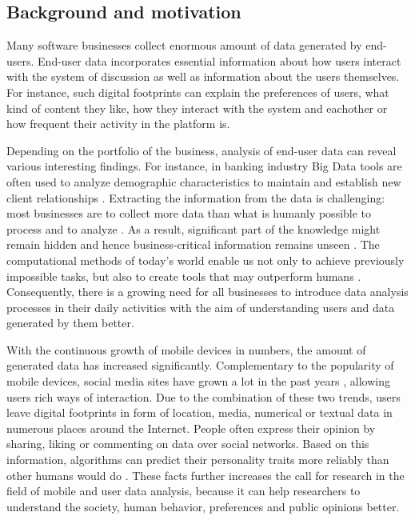 \subsection{Background and motivation}
	Many software businesses collect enormous amount of data generated by end-users. End-user data incorporates essential information about how users interact with the system of discussion as well as information about the users themselves. For instance, such digital footprints can explain the preferences of users, what kind of content they like, how they interact with the system and eachother or how frequent their activity in the platform is.
    
    Depending on the portfolio of the business, analysis of end-user data can reveal various interesting findings. For instance, in banking industry Big Data tools are often used to analyze demographic characteristics to maintain and establish new client relationships \cite{chinesemobilebankingusers, bigdatamanagementrevolution}. Extracting the information from the data is challenging: most businesses are to collect more data than what is humanly possible to process and to analyze \cite{inmon2007tapping, wegener2010integrating}. As a result, significant part of the knowledge might remain hidden and hence business-critical information remains unseen \cite{inmon2007tapping, wegener2010integrating, introtodatamining, chinesemobilebankingusers}. The computational methods of today's world enable us not only to achieve previously impossible tasks, but also to create tools that may outperform humans \cite{youyou2015computer}. Consequently, there is a growing need for all businesses to introduce data analysis processes in their daily activities with the aim of understanding users and data generated by them better.
    
    With the continuous growth of mobile devices in numbers, the amount of generated data has increased significantly. Complementary to the popularity of mobile devices, social media sites have grown a lot in the past years \cite{ottoni2013ladies, hu2014we, bakhshi2014faces, waheed2017investigation}, allowing users rich ways of interaction. Due to the combination of these two trends, users leave digital footprints in form of location, media, numerical or textual data in numerous places around the Internet. People often express their opinion by sharing, liking or commenting on data over social networks. Based on this information, algorithms can predict their personality traits more reliably than other humans would do \cite{youyou2015computer}. These facts further increases the call for research in the field of mobile and user data analysis, because it can help researchers to understand the society, human behavior, preferences and public opinions better.

